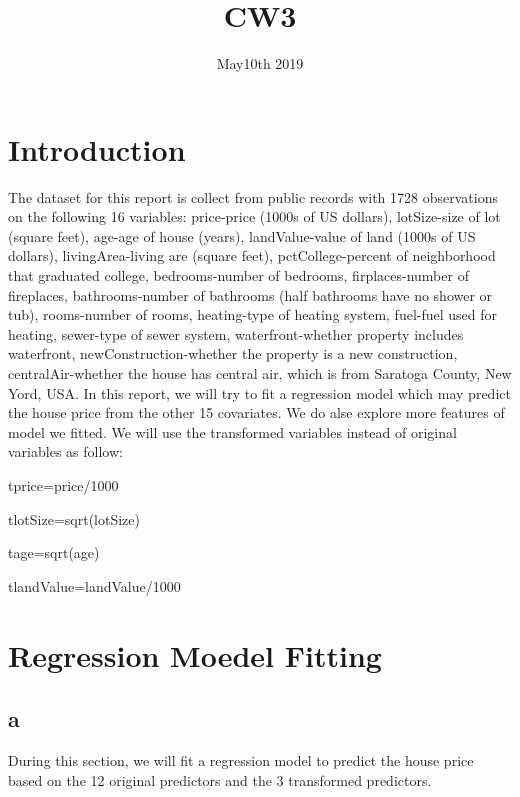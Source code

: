 \documentclass[12pt]{article}
\title{CW3}
\date{May10th 2019}
\begin{document}
	\maketitle
	
	\newpage
	\tableofcontents
	\newpage
	
	

\section{Introduction}
The dataset for this report is collect from public records with 1728 observations on the following 16 variables: price-price (1000s of US dollars), lotSize-size of lot (square feet), age-age of house (years), landValue-value of land (1000s of US dollars), livingArea-living are (square feet), pctCollege-percent of neighborhood that graduated college, bedrooms-number of bedrooms, firplaces-number of fireplaces, bathrooms-number of bathrooms (half bathrooms have no shower or tub), rooms-number of rooms, heating-type of heating system, fuel-fuel used for heating, sewer-type of sewer system, waterfront-whether property includes waterfront, newConstruction-whether the property is a new construction, centralAir-whether the house has central air, which is from Saratoga County, New Yord, USA.
In this report, we will try to fit a regression model which may predict the house price from the other 15 covariates. We do alse explore more features of model we fitted. We will use the transformed variables instead of original variables as follow:

\noindent
tprice=price/1000

\noindent
tlotSize=sqrt(lotSize)

\noindent
tage=sqrt(age)

\noindent
tlandValue=landValue/1000
 
	
	
	
	
	
	
	
	
	
	
	
	
	
	
\section{Regression Moedel Fitting}	
	
	\subsection{a}
	During this section, we will fit a regression model to predict the house price based on the 12 original predictors and the 3 transformed predictors. 
\end{document}
